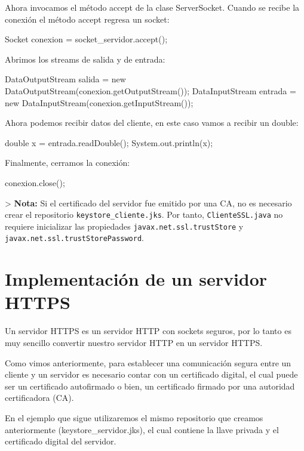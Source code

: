 Ahora invocamos el método accept de la clase ServerSocket. Cuando se recibe la conexión el método accept regresa un socket:

\begin{SourceCode}
Socket conexion = socket_servidor.accept();
\end{SourceCode}

Abrimos los streams de salida y de entrada:

\begin{SourceCode}
DataOutputStream salida = new DataOutputStream(conexion.getOutputStream());
DataInputStream entrada = new DataInputStream(conexion.getInputStream());
\end{SourceCode}

Ahora podemos recibir datos del cliente, en este caso vamos a recibir un double:

\begin{SourceCode}
double x = entrada.readDouble();
System.out.println(x);
\end{SourceCode}

Finalmente, cerramos la conexión:

\begin{SourceCode}
conexion.close();
\end{SourceCode}

> \textbf{Nota:} Si el certificado del servidor fue emitido por una CA, no es necesario crear el repositorio \texttt{keystore\_cliente.jks}. Por tanto, \texttt{ClienteSSL.java} no requiere inicializar las propiedades \texttt{javax.net.ssl.trustStore} y \texttt{javax.net.ssl.trustStorePassword}.

\section{Implementación de un servidor HTTPS}

Un servidor HTTPS es un servidor HTTP con sockets seguros, por lo tanto es muy sencillo convertir nuestro servidor HTTP en un servidor HTTPS.

Como vimos anteriormente, para establecer una comunicación segura entre un cliente y un servidor es necesario contar con un certificado digital, el cual puede ser un certificado autofirmado o bien, un certificado firmado por una autoridad certificadora (CA).

En el ejemplo que sigue utilizaremos el mismo repositorio que creamos anteriormente (keystore\_servidor.jks), el cual contiene la llave privada y el certificado digital del servidor.

